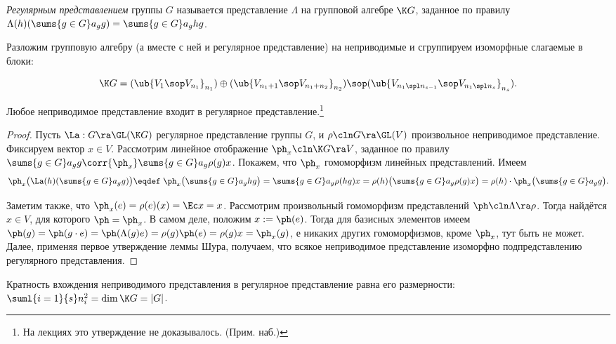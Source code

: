 \documentclass[a4paper]{article}
\newcommand{\sumg}{\sums{g\in G}}
\begin{document}
\begin{df}
\emph{Регулярным представлением} группы $G$ называется представление $\Lambda$ на групповой алгебре  $\K
G$, заданное по правилу $\Lambda(h)(\sumg a_g g)=\sumg a_g h g$.
\end{df}

Разложим групповую алгебру (а вместе с ней и регулярное представление) на неприводимые и сгруппируем
изоморфные слагаемые в блоки:

$$\K G=(\ub{V_1 \sop V_{n_1}}_{n_1}) \oplus (\ub{V_{n_1+1} \sop V_{n_1+n_2}}_{n_2}) \sop (\ub{V_{n_1 \spl n_{s-1}} \sop V_{n_1 \spl n_s}}_{n_s}).$$

\begin{stm}
Любое неприводимое представление входит в регулярное представление.\footnote[1]{На лекциях это утверждение
не доказывалось. (Прим. наб.)}
\end{stm}
\begin{proof}
Пусть $\La: G \ra \GL(\K G)$ регулярное представление группы $G$, и $\rho\cln G \ra \GL(V)$
произвольное неприводимое представление. Фиксируем вектор $x \in V$. Рассмотрим линейное отображение $\ph_x\cln \K G \ra V$, заданное по правилу $\sumg a_g g \corr{\ph_x} \sumg a_g \rho(g) x$. Покажем, что $\ph_x$
гомоморфизм линейных представлений. Имеем
$$\ph_x\bigl(\La(h)(\sumg a_g g)\bigr) \eqdef \; \ph_x\bigl(\sumg a_g h g\bigr)=\sumg a_g \rho(hg)x=\rho(h)\bigl(\sumg a_g \rho(g)x\bigr)=\rho(h)\cdot \ph_x\bigl(\sumg a_g g\bigr).$$

Заметим также, что $\ph_x(e)=\rho(e)(x)=\Ec x =x$. Рассмотрим произвольный гомоморфизм представлений  $\ph\cln \Lambda \ra \rho$. Тогда найдётся $x \in V$, для которого $\ph = \ph_x$. В самом деле, положим $x:=\ph(e)$.
Тогда для базисных элементов имеем $\ph(g)=\ph(g \cdot e)=\ph(\Lambda(g)e)=\rho(g)\ph(e)=\rho(g)x=\ph_x(g)$,
е никаких других гомоморфизмов, кроме $\ph_x$, тут быть не может. Далее, применяя первое утверждение
леммы Шура, получаем, что всякое неприводимое представление изоморфно подпредставлению регулярного
представления.
\end{proof}

\begin{imp}
Кратность вхождения неприводимого представления в регулярное представление равна его размерности:
$\suml{i=1}{s}n_i^2=\dim \K G = |G|$.
\end{imp}
\end{document}
